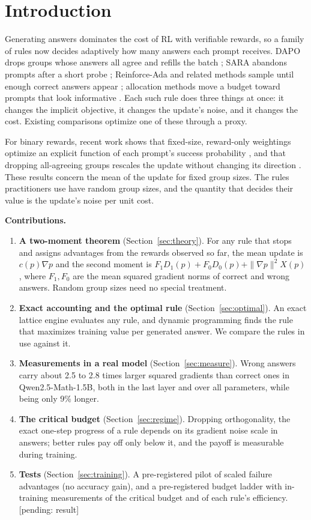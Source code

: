 \documentclass[11pt]{article}
\newcommand{\pending}[1]{\textcolor{red!60!black}{[pending: #1]}}
\begin{document}
\section{Introduction}
Generating answers dominates the cost of RL with verifiable rewards, so a family of rules now decides adaptively how many answers each prompt receives. DAPO drops groups whose answers all agree and refills the batch \citep{yu2025dapo}; SARA abandons prompts after a short probe \citep{sara2026}; Reinforce-Ada and related methods sample until enough correct answers appear \citep{xiong2025reinforceada}; allocation methods move a budget toward prompts that look informative \citep{knapsack2025,yao2025gvm}. Each such rule does three things at once: it changes the implicit objective, it changes the update's noise, and it changes the cost. Existing comparisons optimize one of these through a proxy.

For binary rewards, recent work shows that fixed-size, reward-only weightings optimize an explicit function of each prompt's success probability \citep{davis2025objective,mroueh2025grpo,thrampoulidis2025shaping}, and that dropping all-agreeing groups rescales the update without changing its direction \citep{okonkwo2026arcus}. These results concern the mean of the update for fixed group sizes. The rules practitioners use have random group sizes, and the quantity that decides their value is the update's noise per unit cost.

\textbf{Contributions.}
\begin{enumerate}[leftmargin=*,itemsep=2pt,topsep=2pt]
\item \textbf{A two-moment theorem} (Section~\ref{sec:theory}). For any rule that stops and assigns advantages from the rewards observed so far, the mean update is $c(p)\nabla p$ and the second moment is $F_1D_1(p)+F_0D_0(p)+\|\nabla p\|^2X(p)$, where $F_1,F_0$ are the mean squared gradient norms of correct and wrong answers. Random group sizes need no special treatment.
\item \textbf{Exact accounting and the optimal rule} (Section~\ref{sec:optimal}). An exact lattice engine evaluates any rule, and dynamic programming finds the rule that maximizes training value per generated answer. We compare the rules in use against it.
\item \textbf{Measurements in a real model} (Section~\ref{sec:measure}). Wrong answers carry about 2.5 to 2.8 times larger squared gradients than correct ones in Qwen2.5-Math-1.5B, both in the last layer and over all parameters, while being only 9\% longer.
\item \textbf{The critical budget} (Section~\ref{sec:regime}). Dropping orthogonality, the exact one-step progress of a rule depends on its gradient noise scale in answers; better rules pay off only below it, and the payoff is measurable during training.
\item \textbf{Tests} (Section~\ref{sec:training}). A pre-registered pilot of scaled failure advantages (no accuracy gain), and a pre-registered budget ladder with in-training measurements of the critical budget and of each rule's efficiency. \pending{result}
\end{enumerate}
\end{document}
